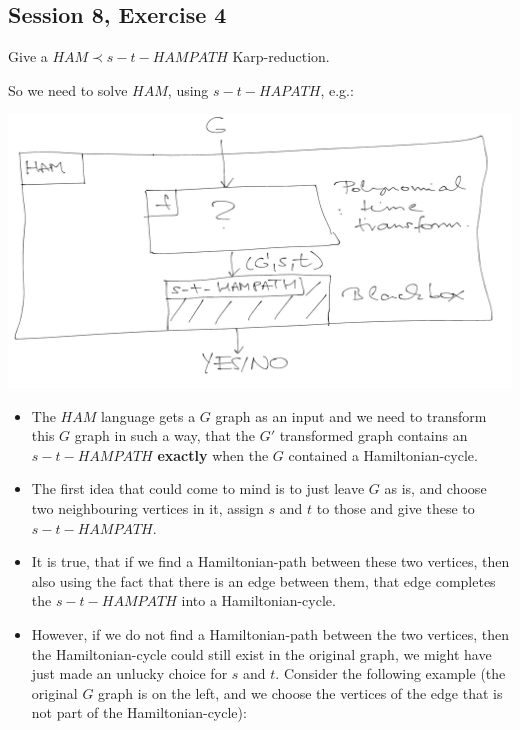 \subsection {Session 8, Exercise 4}
\label{8_4}


Give a $HAM \prec s-t-HAMPATH$ Karp-reduction.


So we need to solve $HAM$, using $s-t-HAPATH$, e.g.:

\begin{center}
    \includegraphics[width=\linewidth]{./08/03/ham_stham_karp.png}
\end{center}

\begin{itemize}
    \item The $HAM$ language gets a $G$ graph as an input and we need to transform this $G$ graph in such a way, that the $G'$ transformed graph contains an $s-t-HAMPATH$ \textbf{exactly} when the $G$ contained a Hamiltonian-cycle.
    \item The first idea that could come to mind is to just leave $G$ as is, and choose two neighbouring vertices in it, assign $s$ and $t$ to those and give these to $s-t-HAMPATH$.
    \item It is true, that if we find a Hamiltonian-path between these two vertices, then also using the fact that there is an edge between them, that edge completes the $s-t-HAMPATH$ into a Hamiltonian-cycle.
    \item However, if we do not find a Hamiltonian-path between the two vertices, then the Hamiltonian-cycle could still exist in the original graph, we might have just made an unlucky choice for $s$ and $t$. Consider the following example (the original $G$ graph is on the left, and we choose the vertices of the edge that is not part of the Hamiltonian-cycle):
\end{itemize}

